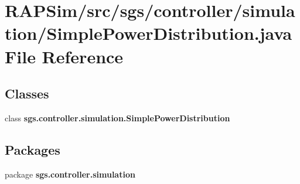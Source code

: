 \section{R\-A\-P\-Sim/src/sgs/controller/simulation/\-Simple\-Power\-Distribution.java File Reference}
\label{_simple_power_distribution_8java}
\subsection*{Classes}
\begin{DoxyCompactItemize}
\item 
class {\bf sgs.\-controller.\-simulation.\-Simple\-Power\-Distribution}
\end{DoxyCompactItemize}
\subsection*{Packages}
\begin{DoxyCompactItemize}
\item 
package {\bf sgs.\-controller.\-simulation}
\end{DoxyCompactItemize}
